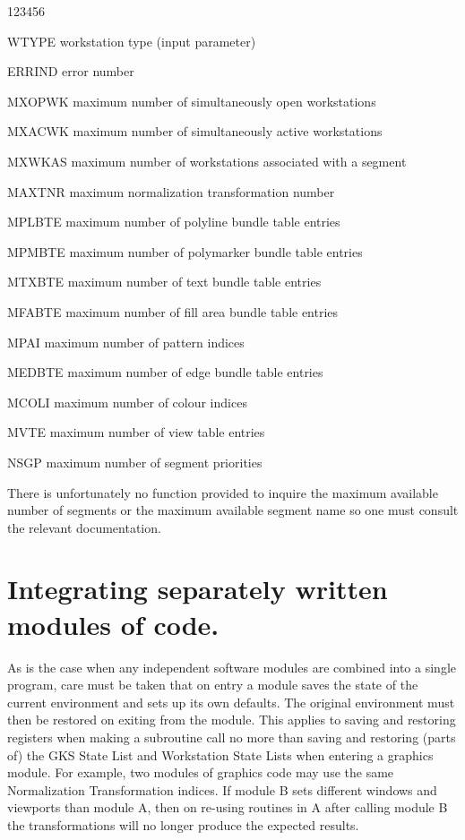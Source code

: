 \begin{DLtt}{123456}
\item[WTYPE]workstation type (input parameter)
\item[ERRIND]error number
\item[MXOPWK]maximum number of simultaneously open workstations
\item[MXACWK]maximum number of simultaneously active workstations
\item[MXWKAS]maximum number of workstations associated with a segment
\item[MAXTNR]maximum normalization transformation number
\item[MPLBTE]maximum number of polyline bundle table entries
\item[MPMBTE]maximum number of polymarker bundle table entries
\item[MTXBTE]maximum number of text bundle table entries
\item[MFABTE]maximum number of fill area bundle table entries
\item[MPAI]maximum number of pattern indices
\item[MEDBTE]maximum number of edge bundle table entries
\item[MCOLI]maximum number of colour indices
\item[MVTE]maximum number of view table entries
\item[NSGP]maximum number of segment priorities
\end{DLtt}
There is unfortunately no function provided to inquire the maximum available
number of segments or the maximum available segment name so one must consult
the relevant documentation.
\section{Integrating separately written modules of code.}
 
As is the case when any independent software modules are combined into a
single program, care must be taken that on entry a module saves the
state of the current environment and sets up its own defaults.
The original environment must then be restored on exiting from
the module. This applies to saving and restoring registers when
making a subroutine call no more than saving and restoring (parts of) the
GKS State List and Workstation State Lists when entering a graphics module.
For example, two modules of graphics code may use the same Normalization
Transformation indices. If module B sets different windows and viewports
than module A, then on re-using routines in A after calling module B the
transformations will no longer produce the expected results.
 

